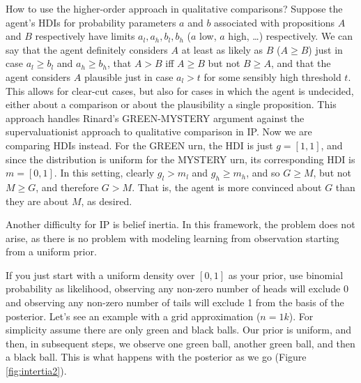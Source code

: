 \documentclass[
  10pt,
  dvipsnames,enabledeprecatedfontcommands]{scrartcl}
\begin{document}
How to use the higher-order approach in qualitative comparisons? Suppose
the agent's HDIs for probability parameters \(a\) and \(b\) associated
with propositions \(A\) and \(B\) respectively have limits
\(a_l, a_h, b_l, b_h\) (\(a\) low, \(a\) high, \dots) respectively. We
can say that the agent definitely considers \(A\) at least as likely as
\(B\) (\(A\geq B\)) just in case \(a_l\geq b_l\) and \(a_h \geq b_h\),
that \(A>B\) iff \(A\geq B\) but not \(B \geq A\), and that the agent
considers \(A\) plausible just in case \(a_l>t\) for some sensibly high
threshold \(t\). This allows for clear-cut cases, but also for cases in
which the agent is undecided, either about a comparison or about the
plausibility a single proposition. This approach handles Rinard's
GREEN-MYSTERY argument against the supervaluationist approach to
qualitative comparison in \textsf{IP}. Now we are comparing HDIs
instead. For the GREEN urn, the HDI is just \(g=[1,1]\), and since the
distribution is uniform for the MYSTERY urn, its corresponding HDI is
\(m = [0,1]\). In this setting, clearly \(g_l> m_l\) and
\(g_h \geq m_h\), and so \(G\geq M\), but not \(M\geq G\), and therefore
\(G>M\). That is, the agent is more convinced about \(G\) than they are
about \(M\), as desired.

Another difficulty for \textsf{IP} is belief inertia. In this framework,
the problem does not arise, as there is no problem with modeling
learning from observation starting from a uniform prior.

If you just start with a uniform density over \([0,1]\) as your prior,
use binomial probability as likelihood, observing any non-zero number of
heads will exclude 0 and observing any non-zero number of tails will
exclude 1 from the basis of the posterior. Let's see an example with a
grid approximation (\(n=1k\)). For simplicity assume there are only
green and black balls. Our prior is uniform, and then, in subsequent
steps, we observe one green ball, another green ball, and then a black
ball. This is what happens with the posterior as we go (Figure
\ref{fig:intertia2}).
\end{document}
